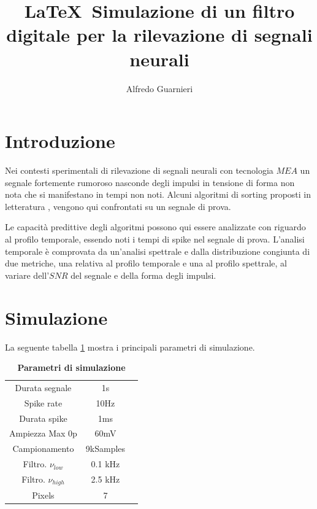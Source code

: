 \documentclass[9pt,twocolumn,twoside]{osajnl}
\title{\LaTeX\  Simulazione di un filtro digitale per la rilevazione di segnali neurali \emph{ }}
\author[1]{Alfredo Guarnieri}
\begin{document}
\maketitle



\section{Introduzione}

Nei contesti sperimentali di rilevazione di segnali neurali con tecnologia $MEA$ un segnale fortemente rumoroso nasconde degli impulsi in tensione di forma non nota che si manifestano in tempi non noti. Alcuni algoritmi di sorting proposti in letteratura
\cite{Vallicelli2017}, \cite{Lambacher2011} vengono  qui confrontati su un segnale di prova.

Le capacità predittive degli algoritmi possono qui essere analizzate con riguardo al profilo temporale, essendo noti i tempi di spike nel segnale di prova. L'analisi temporale è comprovata da un'analisi spettrale e dalla distribuzione congiunta di due metriche, una relativa al profilo temporale e una al profilo spettrale, al variare dell'$SNR$ del segnale e della forma degli impulsi.


% 



\section{Simulazione}
\label{sec:examples}

La seguente tabella \ref{tab:param} mostra i principali parametri di simulazione.

\begin{table}[htbp]
\centering
\caption{\bf Parametri di simulazione}
\begin{tabular}{ccc}
\hline
Durata segnale       & 1s         \\
Spike rate           & 10Hz       \\
Durata spike         & 1ms        \\
Ampiezza Max 0p      & 60mV       \\
Campionamento        & 9kSamples  \\
Filtro. $\nu_{low}$  & 0.1 kHz     \\
Filtro. $\nu_{high}$ & 2.5 kHz     \\
Pixels               & 7 \\
\hline
\end{tabular}
\label{tab:param}
\end{table}
\end{document}
